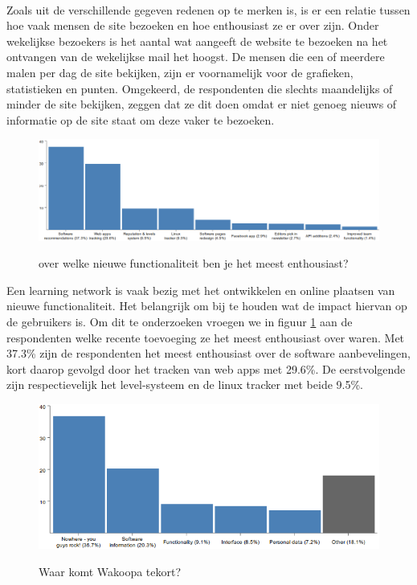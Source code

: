 \documentclass[a4paper, 10pt, pdftex]{report}
\begin{document}
      \paragraph{}Zoals uit de verschillende gegeven redenen op te merken is, is er een relatie tussen hoe vaak mensen de site bezoeken en hoe enthousiast ze er over zijn. Onder wekelijkse bezoekers is het aantal wat aangeeft de website te bezoeken na het ontvangen van de wekelijkse mail het hoogst. De mensen die een of meerdere malen per dag de site bekijken, zijn er voornamelijk voor de grafieken, statistieken en punten. Omgekeerd, de respondenten die slechts maandelijks of minder de site bekijken, zeggen dat ze dit doen omdat er niet genoeg nieuws of informatie op de site staat om deze vaker te bezoeken.

        \begin{figure}
          \begin{center}
          \caption{over welke nieuwe functionaliteit ben je het meest enthousiast?}
            \includegraphics[width=\textwidth]{../images/enquete/recent-additions}
          \label{fig:enthousiast}
          \end{center}
        \end{figure}

      Een learning network is vaak bezig met het ontwikkelen en online plaatsen van nieuwe functionaliteit. Het belangrijk om bij te houden wat de impact hiervan op de gebruikers is. Om dit te onderzoeken vroegen we in figuur \ref{fig:enthousiast} aan de respondenten welke recente toevoeging ze het meest enthousiast over waren. Met 37.3\% zijn de respondenten het meest enthousiast over de software aanbevelingen, kort daarop gevolgd door het tracken van web apps met 29.6\%. De eerstvolgende zijn respectievelijk het level-systeem en de linux tracker met beide 9.5\%.

        \begin{figure}
          \begin{center}
          \caption{Waar komt Wakoopa tekort?}
            \includegraphics[width=\textwidth]{../images/enquete/improvement}
          \label{fig:improvement}
          \end{center}
        \end{figure}
\end{document}
